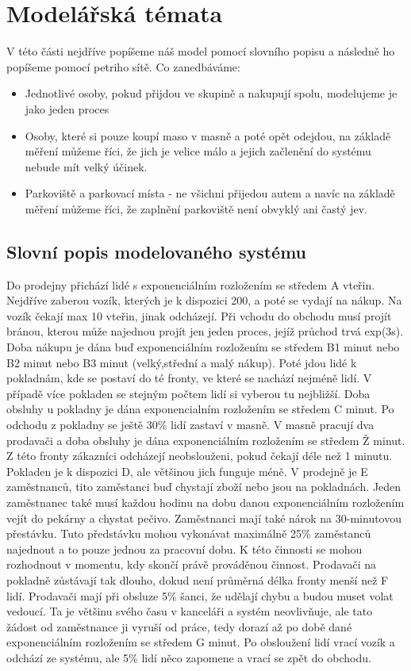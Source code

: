 \documentclass[12pt,a4paper]{report}
\begin{document}
\section{Modelářská témata}
V této části nejdříve popíšeme náš model pomocí slovního popisu a následně ho popíšeme pomocí petriho sítě. Co zanedbáváme:
\begin{itemize}
\item Jednotlivé osoby, pokud přijdou ve skupině a nakupují spolu, modelujeme je jako jeden proces
\item Osoby, které si pouze koupí maso v masně a poté opět odejdou, na základě měření můžeme říci, že jich je velice málo a jejich začlenění do systému nebude mít velký účinek.
\item Parkoviště a parkovací místa - ne všichni přijedou autem a navíc na základě měření můžeme říci, že zaplnění parkoviště není obvyklý ani častý jev.
\end{itemize}
\subsection{Slovní popis modelovaného systému}
Do prodejny přichází lidé s exponenciálním rozložením se středem A vteřin.  Nejdříve zaberou vozík, kterých je k dispozici 200, a poté se vydají na nákup. Na vozík čekají max 10 vteřin, jinak odcházejí. Při vchodu do obchodu musí projít bránou, kterou může najednou projít jen jeden proces, jejíž průchod trvá exp(3s). Doba nákupu je dána  buď exponenciálním rozložením se středem B1 minut nebo B2 minut nebo B3 minut (velký,střední a malý nákup). Poté jdou lidé k pokladnám, kde se postaví do té fronty, ve které se nachází nejméně lidí. V případě více pokladen se stejným počtem lidí si vyberou tu nejbližší. Doba obsluhy u pokladny je dána exponencialním rozložením se středem C minut. Po odchodu z pokladny se ještě 30\% lidí zastaví v masně. V masně pracují dva prodavači a doba obsluhy je dána exponenciálním rozložením se středem Ž minut. Z této fronty zákazníci odcházejí neobslouženi, pokud čekají déle než 1 minutu. Pokladen je k dispozici D, ale většinou jich funguje méně. V prodejně je E zaměstnanců, tito zaměstanci buď chystají zboží nebo jsou na pokladnách. Jeden zaměstnanec také musí každou hodinu na dobu danou exponenciálním rozložením vejít do pekárny a chystat pečivo. Zaměstnanci mají také nárok na 30-minutovou přestávku. Tuto předstávku mohou vykonávat maximálně 25\% zaměstanců najednout a to pouze jednou za pracovní dobu. K této činnosti se mohou rozhodnout v momentu, kdy skončí právě prováděnou činnost. Prodavači na pokladně zůstávají tak dlouho, dokud není průměrná délka fronty menší než F lidí. Prodavači mají při obsluze 5\% šanci, že udělají chybu a budou muset volat vedoucí. Ta je většinu svého času v kanceláři a systém neovlivňuje, ale tato žádost od zaměstnance ji vyruší od práce, tedy dorazí až po době dané exponenciálním rozložením se středem G minut. Po obsloužení lidí vrací vozík a odchází ze systému, ale 5\% lidí něco zapomene a vrací se zpět do obchodu.
\end{document}
